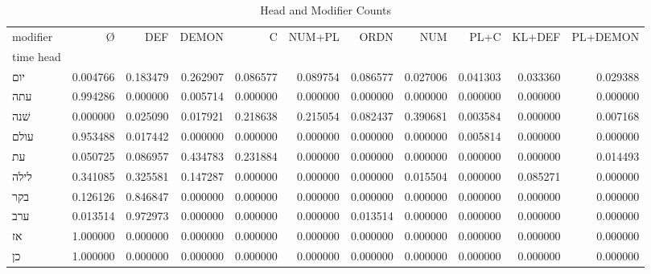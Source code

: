 \begin{table}[htbp!]
\centering
\caption{Head and Modifier Counts}
\label{table:head_modi_pr}
\begin{tabular}{lrrrrrrrrrr}
\toprule
modifier &         Ø &       DEF &     DEMON &         C &    NUM+PL &      ORDN &       NUM &      PL+C &    KL+DEF &  PL+DEMON \\
time head &           &           &           &           &           &           &           &           &           &           \\
\midrule
יום       &  0.004766 &  0.183479 &  0.262907 &  0.086577 &  0.089754 &  0.086577 &  0.027006 &  0.041303 &  0.033360 &  0.029388 \\
עתה       &  0.994286 &  0.000000 &  0.005714 &  0.000000 &  0.000000 &  0.000000 &  0.000000 &  0.000000 &  0.000000 &  0.000000 \\
שׁנה      &  0.000000 &  0.025090 &  0.017921 &  0.218638 &  0.215054 &  0.082437 &  0.390681 &  0.003584 &  0.000000 &  0.007168 \\
עולם      &  0.953488 &  0.017442 &  0.000000 &  0.000000 &  0.000000 &  0.000000 &  0.000000 &  0.005814 &  0.000000 &  0.000000 \\
עת        &  0.050725 &  0.086957 &  0.434783 &  0.231884 &  0.000000 &  0.000000 &  0.000000 &  0.000000 &  0.000000 &  0.014493 \\
לילה      &  0.341085 &  0.325581 &  0.147287 &  0.000000 &  0.000000 &  0.000000 &  0.015504 &  0.000000 &  0.085271 &  0.000000 \\
בקר       &  0.126126 &  0.846847 &  0.000000 &  0.000000 &  0.000000 &  0.000000 &  0.000000 &  0.000000 &  0.000000 &  0.000000 \\
ערב       &  0.013514 &  0.972973 &  0.000000 &  0.000000 &  0.000000 &  0.013514 &  0.000000 &  0.000000 &  0.000000 &  0.000000 \\
אז        &  1.000000 &  0.000000 &  0.000000 &  0.000000 &  0.000000 &  0.000000 &  0.000000 &  0.000000 &  0.000000 &  0.000000 \\
כן        &  1.000000 &  0.000000 &  0.000000 &  0.000000 &  0.000000 &  0.000000 &  0.000000 &  0.000000 &  0.000000 &  0.000000 \\
\bottomrule
\end{tabular}
\end{table}
